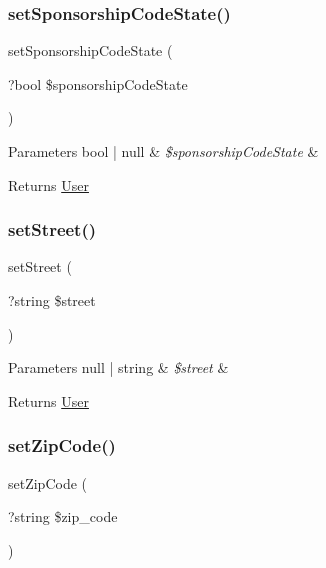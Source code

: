 \subsubsection{\texorpdfstring{setSponsorshipCodeState()}{setSponsorshipCodeState()}}
{\footnotesize\ttfamily set\+Sponsorship\+Code\+State (\begin{DoxyParamCaption}\item[{?bool}]{\$sponsorship\+Code\+State }\end{DoxyParamCaption})}


\begin{DoxyParams}[1]{Parameters}
bool | null & {\em \$sponsorship\+Code\+State} & \\
\hline
\end{DoxyParams}
\begin{DoxyReturn}{Returns}
\mbox{\hyperlink{class_app_1_1_entity_1_1_user}{User}} 
\end{DoxyReturn}
\mbox{\label{class_app_1_1_entity_1_1_user_a50fcef04f17ffeb002082b4e4d54193a}} 
\subsubsection{\texorpdfstring{setStreet()}{setStreet()}}
{\footnotesize\ttfamily set\+Street (\begin{DoxyParamCaption}\item[{?string}]{\$street }\end{DoxyParamCaption})}


\begin{DoxyParams}[1]{Parameters}
null | string & {\em \$street} & \\
\hline
\end{DoxyParams}
\begin{DoxyReturn}{Returns}
\mbox{\hyperlink{class_app_1_1_entity_1_1_user}{User}} 
\end{DoxyReturn}
\mbox{\label{class_app_1_1_entity_1_1_user_a71404327a2dd4c39022ed57eaf894f34}} 
\subsubsection{\texorpdfstring{setZipCode()}{setZipCode()}}
{\footnotesize\ttfamily set\+Zip\+Code (\begin{DoxyParamCaption}\item[{?string}]{\$zip\+\_\+code }\end{DoxyParamCaption})}


